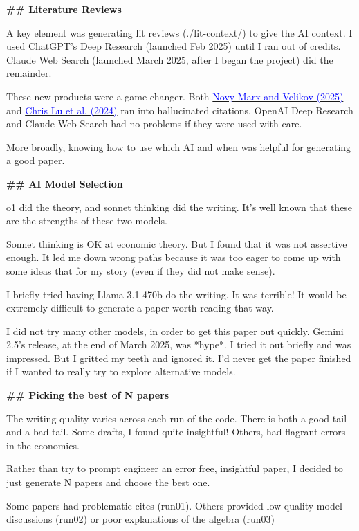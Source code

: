 \begin{mdframed}[linewidth=1pt, linecolor=black]
\textbf{\textcolor{red!70!black}{\#\# Literature Reviews}}

A key element was generating lit reviews (\colorbox{gray!10}{\textcolor{red!70!black}{./lit-context/}}) to give the AI context. I used ChatGPT's Deep Research (launched Feb 2025) until I ran out of credits. Claude Web Search (launched March 2025, after I began the project) did the remainder.

These new products were a game changer. Both \href{https://www.nber.org/papers/w33363}{\textcolor{blue}{Novy-Marx and Velikov (2025)}}  and \href{https://arxiv.org/abs/2408.06292}{\textcolor{blue}{Chris Lu et al. (2024)}} ran into hallucinated citations. OpenAI Deep Research and Claude Web Search had no problems if they were used with care. 

More broadly, knowing how to use which AI and when was helpful for generating a good paper. 

\textbf{\textcolor{red!70!black}{\#\# AI Model Selection }}

o1 did the theory, and sonnet thinking did the writing. It's well known that these are the strengths of these two models. 

Sonnet thinking is OK at economic theory. But I found that it was not assertive enough. It led me down wrong paths because it was too eager to come up with some ideas that for my story (even if they did not make sense).  

I briefly tried having Llama 3.1 470b do the writing. It was terrible! It would be extremely difficult to generate a paper worth reading that way. 

I did not try many other models, in order to get this paper out quickly. Gemini 2.5's release, at the end of March 2025, was *hype*. I tried it out briefly and was impressed. But I gritted my teeth and ignored it. I'd never get the paper finished if I wanted to really try to explore alternative models. 

\textbf{\textcolor{red!70!black}{\#\# Picking the best of N papers}}

The writing quality varies across each run of the code. There is both a good tail and a bad tail. Some drafts, I found quite insightful! Others, had flagrant errors in the economics. 

Rather than try to prompt engineer an error free, insightful paper, I decided to just generate N papers and choose the best one. 

Some papers had problematic cites (\colorbox{gray!10}{\textcolor{red!70!black}{run01}}). Others provided low-quality model discussions (\colorbox{gray!10}{\textcolor{red!70!black}{run02}}) or poor explanations of the algebra (\colorbox{gray!10}{\textcolor{red!70!black}{run03}})


\end{mdframed}
